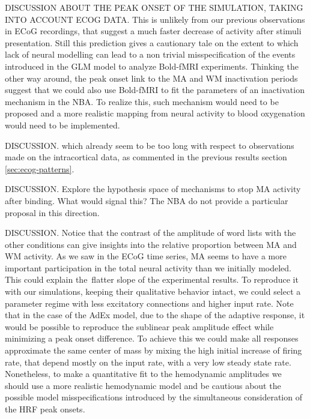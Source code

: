 \documentclass[10pt]{article}
\begin{document}
DISCUSSION ABOUT THE PEAK ONSET OF THE SIMULATION, TAKING INTO ACCOUNT ECOG DATA. This is unlikely from our previous observations in ECoG recordings, that suggest a much faster decrease of activity after stimuli presentation.
Still this prediction gives a cautionary tale on the extent to which lack of neural modelling can lead to a non trivial misspecification of the events introduced in the GLM model to analyze Bold-fMRI experiments.
Thinking the other way around, the peak onset link to the MA and WM inactivation periods suggest that we could also use Bold-fMRI to fit the parameters of an inactivation mechanism in the NBA.
To realize this, such mechanism would need to be proposed and a more realistic mapping from neural activity to blood oxygenation would need to be implemented.

DISCUSSION. which already seem to be too long with respect to observations made on the intracortical data, as commented in the previous results section \ref{sec:ecog-patterns}.


DISCUSSION. Explore the hypothesis space of mechanisms to stop MA activity after binding. What would signal this? The NBA do not provide a particular proposal in this direction.

DISCUSSION. Notice that the contrast of the amplitude of word lists with the other conditions can give insights into the relative proportion between MA and WM activity.
As we saw in the ECoG time series, MA seems to have a more important participation in the total neural activity than we initially modeled.
This could explain the~flatter slope of the experimental results.
To reproduce it with our simulations, keeping their qualitative behavior intact, we could select a parameter regime with less excitatory connections and higher input rate.
Note that in the case of the AdEx model, due to the shape of the adaptive response, it would be possible to reproduce the sublinear peak amplitude effect while minimizing a peak onset difference.
To achieve this we could make all responses approximate the same center of mass by mixing the high initial increase of firing rate, that depend mostly on the input rate, with a very low steady state rate.
Nonetheless, to make a quantitative fit to the hemodynamic amplitudes we should use a more realistic hemodynamic model and be cautious about the possible model misspecifications introduced by the simultaneous consideration of the HRF peak onsets.
\end{document}
